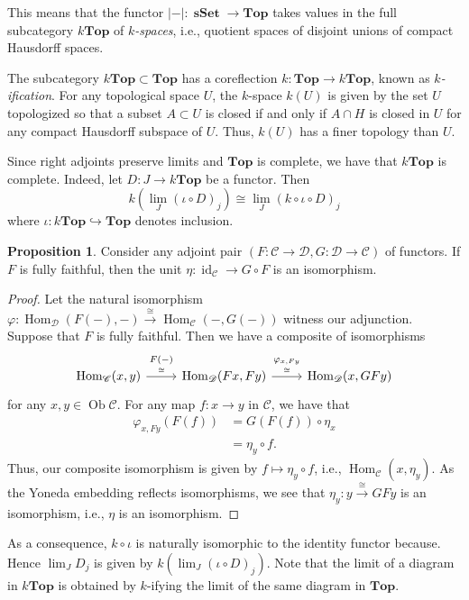 \documentclass[10pt,letterpaper,cm]{nupset}
\theoremstyle{definition}
\theoremstyle{theorem}
\newtheorem{prop}[definition]{Proposition}
\theoremstyle{remark}
\DeclareMathOperator{\ob}{Ob}
\newcommand{\0}{\mathbf{0}}
\newcommand{\1}{\mathbf{1}}
\newcommand{\2}{\mathbf{2}}
\DeclareMathOperator{\sset}{\mathbf{sSet}}
\renewcommand{\c}{\mathscr{C}}
\renewcommand{\d}{\mathscr{D}}
\DeclareMathOperator{\Hom}{Hom}
\DeclareMathOperator{\idd}{id}
\begin{document}
This means that the functor $\left\lvert{-}\right\rvert : \sset \to \mathbf{Top}$ takes values in the full subcategory $k\mathbf{Top}$ of \textit{$k$-spaces}, i.e., quotient spaces of disjoint unions of compact Hausdorff spaces.

\medskip

The subcategory $k\mathbf{Top}\subset \mathbf{Top}$ has a coreflection $k: \mathbf{Top} \to k\mathbf{Top}$, known as \textit{$k$-ification}. For any topological space $U$, the $k$-space $k(U)$ is given by the set $U$ topologized so that a subset $A\subset U$ is closed if and only if  $A \cap H$ is closed in $U$ for any compact Hausdorff subspace of $U$. Thus, $k(U)$ has a finer topology than $U$.

\medskip

Since right adjoints preserve limits and $\mathbf{Top}$ is complete, we have that $k\mathbf{Top}$ is complete. Indeed, let $D : J \to k\mathbf{Top}$ be a functor. Then
\[
k\left(\lim_J{\left(\iota \circ D\right)_j}\right) \cong \lim_J{\left(k\circ \iota \circ D\right)_j}
\] where $\iota : k\mathbf{Top} \hookrightarrow \mathbf{Top}$ denotes inclusion.
\begin{prop}
Consider any adjoint pair $\left(F: \c \to \d, G: \d \to \c\right)$ of functors. If $F$ is fully faithful, then the unit $\eta : \idd_{\c}\to  G\circ F $ is an isomorphism.
\end{prop}
\begin{proof}
Let the natural isomorphism $\varphi : \Hom_{\d}(F({-}), {-}) \overset{\cong}{\longrightarrow} \Hom_{\c}({-}, G({-}))$ witness our adjunction. Suppose that $F$ is fully faithful. Then we have a composite of isomorphisms
\[
\begin{tikzcd}
{\Hom_{\c}(x,y)} \arrow[r, "\underset{\cong}{F({-})}"] & {\Hom_{\d}(F{x}, F{y})} \arrow[r, "\underset{\cong}{\varphi_{x, F{y}}}"] & {\Hom_{\d}(x, G{F{y}})}
\end{tikzcd}
\] for any $x,y\in \ob{\c}$. For any map $f: x\to y$ in $\c$, we have that 
\begin{align*}
 \varphi_{x,F{y}}(F(f)) & =G(F(f)) \circ \eta_x \tag{unit identity}
 \\ & = \eta_y \circ f \tag{naturality of $\eta$}.
 \end{align*} Thus, our composite isomorphism is given by $f\mapsto \eta_y \circ f$, i.e., $\Hom_{\c}(x, \eta_y)$. As the Yoneda embedding reflects isomorphisms, we see that $\eta_y : y \overset{\cong}{\longrightarrow} G{F{y}}$ is an isomorphism, i.e., $\eta$ is an isomorphism.
\end{proof}
As a consequence, $k\circ \iota$ is naturally isomorphic to the identity functor because. Hence $\lim_J{D_j}$ is given by $k\left(\lim_J{\left(\iota \circ D\right)_j}\right)$. Note that the limit of a diagram in $k\mathbf{Top}$ is obtained by $k$-ifying the limit of the same diagram in $\mathbf{Top}$. 
\end{document}
